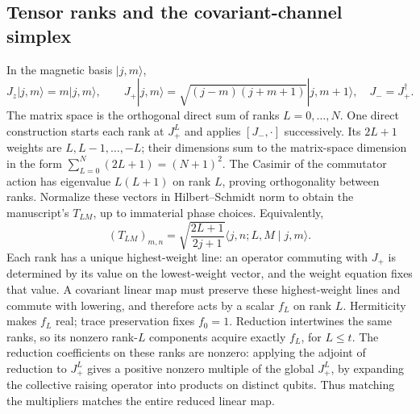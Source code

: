 \documentclass[11pt,a4paper]{article}
\begin{document}
\subsection{Tensor ranks and the covariant-channel simplex}
In the magnetic basis $|j,m\rangle$,
\[
 J_z|j,m\rangle=m|j,m\rangle,\qquad
 J_+|j,m\rangle=\sqrt{(j-m)(j+m+1)}|j,m+1\rangle,
 \quad J_-=J_+^\dagger.
\]
The matrix space is the orthogonal direct sum of ranks $L=0,\ldots,N$.
One direct construction starts each rank at $J_+^L$ and applies
$[J_-,\cdot]$ successively. Its $2L+1$ weights are $L,L-1,\ldots,-L$;
their dimensions sum to the matrix-space dimension in the form
$\sum_{L=0}^N(2L+1)=(N+1)^2$. The Casimir of the commutator action
has eigenvalue $L(L+1)$ on rank $L$, proving orthogonality between ranks.
Normalize these vectors in Hilbert--Schmidt norm to obtain the manuscript's
$T_{LM}$, up to immaterial phase choices. Equivalently,
\[
 (T_{LM})_{m,n}=\sqrt{\frac{2L+1}{2j+1}}
 \langle j,n;L,M\mid j,m\rangle.
\]
Each rank has a unique highest-weight line: an operator commuting with
$J_+$ is determined by its value on the lowest-weight vector, and the
weight equation fixes that value. A covariant linear map must preserve
these highest-weight lines and commute with lowering, and therefore
acts by a scalar $f_L$ on rank $L$. Hermiticity makes $f_L$ real;
trace preservation fixes $f_0=1$. Reduction intertwines the same ranks,
so its nonzero rank-$L$ components acquire exactly $f_L$, for $L\le t$.
The reduction coefficients on these ranks are nonzero: applying the
adjoint of reduction to $J_+^L$ gives a positive nonzero multiple of
the global $J_+^L$, by expanding the collective raising operator into
products on distinct qubits. Thus matching the multipliers matches
the entire reduced linear map.
\end{document}
